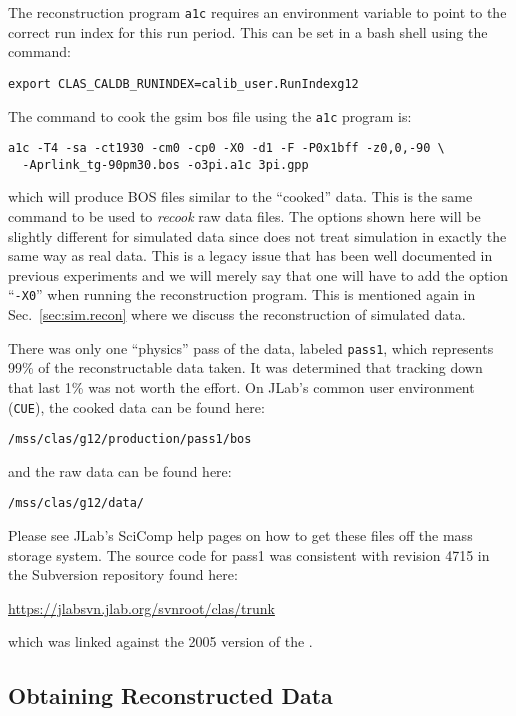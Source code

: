 The reconstruction program \texttt{a1c} requires an environment variable to point to the correct run index for this run period. This can be set in a bash shell using the command:
\begin{verbatim}
export CLAS_CALDB_RUNINDEX=calib_user.RunIndexg12
\end{verbatim}
The command to cook the gsim bos file using the \texttt{a1c} program is:
\begin{verbatim}
a1c -T4 -sa -ct1930 -cm0 -cp0 -X0 -d1 -F -P0x1bff -z0,0,-90 \
  -Aprlink_tg-90pm30.bos -o3pi.a1c 3pi.gpp
\end{verbatim}
which will produce BOS files similar to the ``cooked'' data. This is the same command to be used to \emph{recook} raw data files. The options shown here will be slightly different for simulated data since  does not treat simulation in exactly the same way as real data. This is a legacy issue that has been well documented in previous experiments and we will merely say that one will have to add the option ``\verb+-X0+'' when running the  reconstruction program. This is mentioned again in Sec.~\ref{sec:sim.recon} where we discuss the reconstruction of simulated data.

There was only one ``physics'' pass of the  data, labeled \texttt{pass1}, which represents 99\% of the reconstructable data taken. It was determined that tracking down that last 1\% was not worth the effort. On JLab's common user environment (\texttt{CUE}), the cooked data can be found here:
\begin{center}
    \texttt{/mss/clas/g12/production/pass1/bos}
\end{center}
and the raw data can be found here:
\begin{center}
    \texttt{/mss/clas/g12/data/}
\end{center}
Please see JLab's SciComp help pages on how to get these files off the mass storage system. The source code for pass1 was consistent with revision 4715 in the Subversion repository found here:
\begin{center}
    \url{https://jlabsvn.jlab.org/svnroot/clas/trunk}
\end{center}
which was linked against the 2005 version of the .

\FloatBarrier





\subsection{\label{sec:data.pass1}Obtaining Reconstructed Data}

